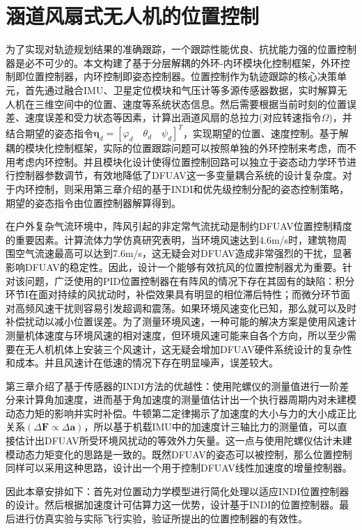 \chapter{涵道风扇式无人机的位置控制}

为了实现对轨迹规划结果的准确跟踪，一个跟踪性能优良、抗扰能力强的位置控制器是必不可少的。本文构建了基于分层解耦的外环-内环模块化控制框架，外环控制即位置控制器，内环控制即姿态控制器。位置控制作为轨迹跟踪的核心决策单元，首先通过融合IMU、卫星定位模块和气压计等多源传感器数据，实时解算无人机在三维空间中的位置、速度等系统状态信息。然后需要根据当前时刻的位置误差、速度误差和受力状态等因素，计算出涵道风扇的总拉力(对应转速指令$\Omega$)，并结合期望的姿态指令$\boldsymbol{\eta}_d=[\varphi_d\quad \theta_d\quad \psi_d]^T$，实现期望的位置、速度控制。基于解耦的模块化控制框架，实际的位置跟踪问题可以按照单独的外环控制来考虑，而不用考虑内环控制。并且模块化设计使得位置控制回路可以独立于姿态动力学环节进行控制器参数调节，有效地降低了DFUAV这一多变量耦合系统的设计复杂度。对于内环控制，则采用第三章介绍的基于INDI和优先级控制分配的姿态控制策略，期望的姿态指令由位置控制器解算得到。

在户外复杂气流环境中，阵风引起的非定常气流扰动是制约DFUAV位置控制精度的重要因素。计算流体力学仿真研究表明，当环境风速达到4.6m/s时，建筑物周围空气流速最高可以达到7.6m/s，这无疑会对DFUAV造成非常强烈的干扰，显著影响DFUAV的稳定性。因此，设计一个能够有效抗风的位置控制器尤为重要。针对该问题，广泛使用的PID位置控制器在有阵风的情况下存在其固有的缺陷：积分环节I在面对持续的风扰动时，补偿效果具有明显的相位滞后特性；而微分环节面对高频风速干扰则容易引发超调和震荡。如果环境风速变化已知，那么就可以及时补偿扰动以减小位置误差。为了测量环境风速，一种可能的解决方案是使用风速计测量机体速度与环境风速的相对速度，但环境风速可能来自各个方向，所以至少需要在无人机机体上安装三个风速计，这无疑会增加DFUAV硬件系统设计的复杂性和成本。并且风速计在低速的情况下存在明显噪声，误差较大。

第三章介绍了基于传感器的INDI方法的优越性：使用陀螺仪的测量值进行一阶差分来计算角加速度，进而基于角加速度的测量值估计出一个执行器周期内对未建模动态力矩的影响并实时补偿。牛顿第二定律揭示了加速度的大小与力的大小成正比关系$(\Delta \boldsymbol{F}\propto\Delta \boldsymbol{a})$，所以基于机载IMU中的加速度计三轴比力的测量值，可以直接估计出DFUAV所受环境风扰动的等效外力矢量。这一点与使用陀螺仪估计未建模动态力矩变化的思路是一致的。既然DFUAV的姿态可以被控制，那么位置控制同样可以采用这种思路，设计出一个用于控制DFUAV线性加速度的增量控制器。

因此本章安排如下：首先对位置动力学模型进行简化处理以适应INDI位置控制器的设计。然后根据加速度计可估算力这一优势，设计基于INDI的位置控制器。最后进行仿真实验与实际飞行实验，验证所提出的位置控制器的有效性。

